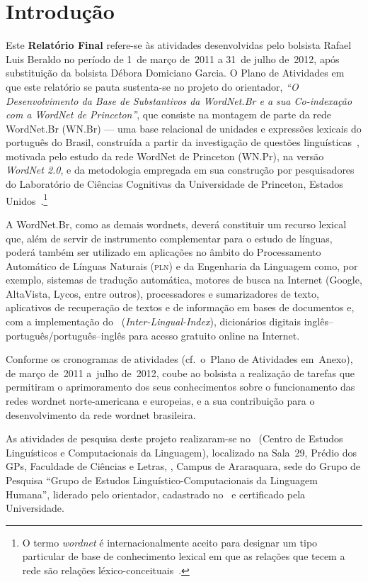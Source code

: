 \chapter{Introdução}

Este \textbf{Relatório Final} refere-se às atividades desenvolvidas pelo
bolsista Rafael Luis Beraldo no período de 1\textordmasculine~de março de~2011
a 31~de julho de~2012, após substituição da bolsista Débora Domiciano Garcia. O
Plano de Atividades em que este relatório se pauta sustenta-se no projeto do
orientador, \textit{``O Desenvolvimento da Base de Substantivos da WordNet.Br e
a sua Co-indexação com a WordNet de Princeton''}, que consiste na montagem de
parte da rede WordNet.Br (WN.Br) --- uma base relacional de unidades e
expressões lexicais do português do Brasil, construída a partir da investigação
de questões linguísticas~\cite{bentoetal,bento}, motivada pelo estudo da rede
WordNet de Princeton (WN.Pr), na versão \textit{WordNet 2.0}, e da metodologia
empregada em sua construção por pesquisadores do Laboratório de Ciências
Cognitivas da Universidade de Princeton, Estados
Unidos~\cite{miller,fellbaum}.\footnote{O termo \textit{wordnet} é
internacionalmente aceito para designar um tipo particular de base de
conhecimento lexical em que as relações que tecem a rede são relações
léxico-conceituais~\cite{marrafa}.} 

A WordNet.Br, como as demais wordnets, deverá constituir um recurso lexical
que, além de servir de instrumento complementar para o estudo de línguas,
poderá também ser utilizado em aplicações no âmbito do Processamento Automático
de Línguas Naturais (\textsc{pln}) e da Engenharia da Linguagem como, por
exemplo, sistemas de tradução automática, motores de busca na Internet (Google,
AltaVista, Lycos, entre outros), processadores e sumarizadores de texto,
aplicativos de recuperação de textos e de informação em bases de documentos e,
com a implementação do
\ili~(\foreignlanguage{english}{\textit{Inter-Lingual-Index}}), dicionários
digitais inglês--português/português--inglês para acesso gratuito online na
Internet.

Conforme os cronogramas de atividades (cf.~o~Plano de Atividades em~Anexo), de
março de~2011 a~julho de~2012, coube ao bolsista a realização de tarefas que
permitiram o aprimoramento dos seus conhecimentos sobre o funcionamento das
redes wordnet norte-americana e europeias, e a sua contribuição para o
desenvolvimento da rede wordnet brasileira.

As atividades de pesquisa deste projeto realizaram-se no \celic\ (Centro de
Estudos Linguísticos e Computacionais da Linguagem), localizado na Sala~29,
Prédio dos GPs, Faculdade de Ciências e Letras, \unesp, Campus de Araraquara,
sede do Grupo de Pesquisa ``Grupo de Estudos Linguístico-Computacionais da
Linguagem Humana'', liderado pelo orientador, cadastrado no \cnpq\ e
certificado pela Universidade.
